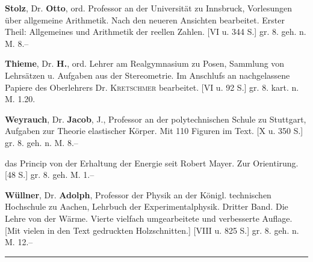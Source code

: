 \documentclass[11pt]{article}
\begin{document}
\textbf{Stolz}, Dr. \textbf{Otto}, ord. Professor an der Universit\"at zu Innsbruck, Vorlesungen \"uber allgemeine Arithmetik. Nach den neueren Ansichten bearbeitet. Erster Theil: Allgemeines und Arithmetik der reellen Zahlen. [VI u. 344 S.] gr. 8. geh. n. M. 8.--

\textbf{Thieme}, Dr. \textbf{H.}, ord. Lehrer am Realgymnasium zu Posen, Sammlung von Lehrs\"atzen u. Aufgaben aus der Stereometrie. Im Anschlufs an nachgelassene Papiere des Oberlehrers Dr. \textsc{Kretschmer} bearbeitet. [VI u. 92 S.] gr. 8. kart. n. M. 1.20.

\textbf{Weyrauch}, Dr. \textbf{Jacob}, J., Professor an der polytechnischen Schule zu Stuttgart, Aufgaben zur Theorie elastischer K\"orper. Mit 110 Figuren im Text. [X u. 350 S.] gr. 8. geh. n. M. 8.--

\textemdash{} das Princip von der Erhaltung der Energie seit Robert Mayer. Zur Orientirung. [48 S.] gr. 8. geh. M. 1.--

\textbf{W\"ullner}, Dr. \textbf{Adolph}, Professor der Physik an der K\"onigl. technischen Hochschule zu Aachen, Lehrbuch der Experimentalphysik. Dritter Band. Die Lehre von der W\"arme. Vierte vielfach umgearbeitete und verbesserte Auflage. [Mit vielen in den Text gedruckten Holzschnitten.] [VIII u. 825 S.] gr. 8. geh. n. M. 12.--

\rule{6em}{0.4pt}
\end{document}

